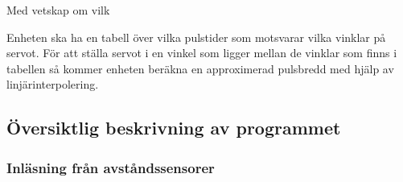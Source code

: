 Med vetskap om vilk


 Enheten ska ha en tabell över vilka pulstider som motsvarar vilka vinklar på servot. För att ställa servot i en vinkel som ligger mellan de vinklar som finns i tabellen så kommer enheten beräkna en approximerad pulsbredd med hjälp av linjärinterpolering.

\subsection{Översiktlig beskrivning av programmet}

\subsubsection{Inläsning från avståndssensorer}







